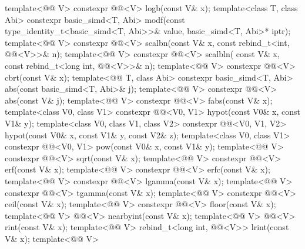 \begin{codeblock}
{  template<@@ V> constexpr @@<V> logb(const V& x);
  template<class T, class Abi>
    constexpr basic_simd<T, Abi> modf(const type_identity_t<basic_simd<T, Abi>>& value,
                                      basic_simd<T, Abi>* iptr);
  template<@@ V> constexpr @@<V> scalbn(const V& x, const
  rebind_t<int, @@<V>>& n);
  template<@@ V>
    constexpr @@<V> scalbln(
      const V& x, const rebind_t<long int, @@<V>>& n);
  template<@@ V> constexpr @@<V> cbrt(const V& x);
  template<@@ T, class Abi>
    constexpr basic_simd<T, Abi> abs(const basic_simd<T, Abi>& j);
  template<@@ V> constexpr @@<V> abs(const V& j);
  template<@@ V> constexpr @@<V> fabs(const V& x);
  template<class V0, class V1>
    constexpr @@<V0, V1> hypot(const V0& x, const V1& y);
  template<class V0, class V1, class V2>
    constexpr @@<V0, V1, V2> hypot(const V0& x, const V1& y, const V2& z);
  template<class V0, class V1>
    constexpr @@<V0, V1> pow(const V0& x, const V1& y);
  template<@@ V> constexpr @@<V> sqrt(const V& x);
  template<@@ V> constexpr @@<V> erf(const V& x);
  template<@@ V> constexpr @@<V> erfc(const V& x);
  template<@@ V> constexpr @@<V> lgamma(const V& x);
  template<@@ V> constexpr @@<V> tgamma(const V& x);
  template<@@ V> constexpr @@<V> ceil(const V& x);
  template<@@ V> constexpr @@<V> floor(const V& x);
  template<@@ V> @@<V> nearbyint(const V& x);
  template<@@ V> @@<V> rint(const V& x);
  template<@@ V>
    rebind_t<long int, @@<V>> lrint(const V& x);
  template<@@ V>
}
\end{codeblock}
